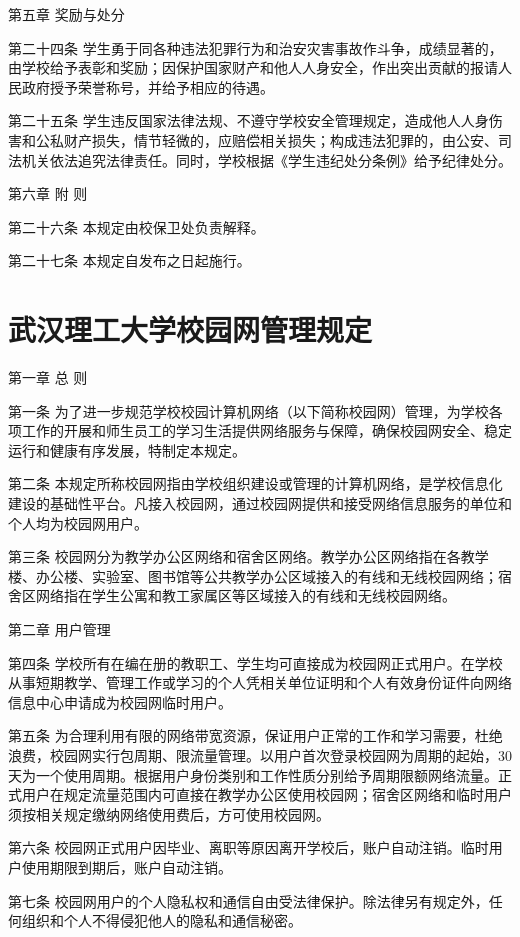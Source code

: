\documentclass[UTF8,12pt,a4paper]{report}
\begin{document}
第五章 奖励与处分

第二十四条 学生勇于同各种违法犯罪行为和治安灾害事故作斗争，成绩显著的，由学校给予表彰和奖励；因保护国家财产和他人人身安全，作出突出贡献的报请人民政府授予荣誉称号，并给予相应的待遇。

第二十五条 学生违反国家法律法规、不遵守学校安全管理规定，造成他人人身伤害和公私财产损失，情节轻微的，应赔偿相关损失；构成违法犯罪的，由公安、司法机关依法追究法律责任。同时，学校根据《学生违纪处分条例》给予纪律处分。

第六章 附 则

第二十六条 本规定由校保卫处负责解释。

第二十七条 本规定自发布之日起施行。

\chapter{武汉理工大学校园网管理规定}
第一章 总 则

第一条 为了进一步规范学校校园计算机网络（以下简称校园网）管理，为学校各项工作的开展和师生员工的学习生活提供网络服务与保障，确保校园网安全、稳定运行和健康有序发展，特制定本规定。

第二条 本规定所称校园网指由学校组织建设或管理的计算机网络，是学校信息化建设的基础性平台。凡接入校园网，通过校园网提供和接受网络信息服务的单位和个人均为校园网用户。

第三条 校园网分为教学办公区网络和宿舍区网络。教学办公区网络指在各教学楼、办公楼、实验室、图书馆等公共教学办公区域接入的有线和无线校园网络；宿舍区网络指在学生公寓和教工家属区等区域接入的有线和无线校园网络。

第二章 用户管理

第四条 学校所有在编在册的教职工、学生均可直接成为校园网正式用户。在学校从事短期教学、管理工作或学习的个人凭相关单位证明和个人有效身份证件向网络信息中心申请成为校园网临时用户。

第五条 为合理利用有限的网络带宽资源，保证用户正常的工作和学习需要，杜绝浪费，校园网实行包周期、限流量管理。以用户首次登录校园网为周期的起始，30天为一个使用周期。根据用户身份类别和工作性质分别给予周期限额网络流量。正式用户在规定流量范围内可直接在教学办公区使用校园网；宿舍区网络和临时用户须按相关规定缴纳网络使用费后，方可使用校园网。

第六条 校园网正式用户因毕业、离职等原因离开学校后，账户自动注销。临时用户使用期限到期后，账户自动注销。

第七条 校园网用户的个人隐私权和通信自由受法律保护。除法律另有规定外，任何组织和个人不得侵犯他人的隐私和通信秘密。
\end{document}
